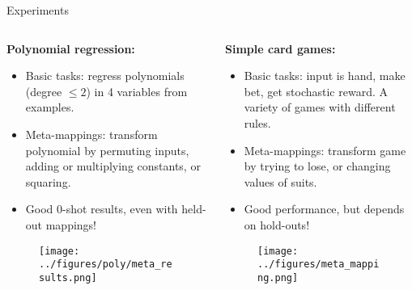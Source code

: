 \documentclass[final]{beamer}
\begin{document}
\begin{frame}[t]{}
\begin{columns}
\begin{column}[t]{0.496\textwidth}
\begin{block}{\huge Experiments}
\vspace{-0.5em}
\begin{columns}
\begin{column}[t]{0.48\textwidth}
\textbf{Polynomial regression:}
\begin{itemize}
\item Basic tasks: regress polynomials (degree \(\leq 2\)) in 4 variables from examples. 
\item Meta-mappings: transform polynomial by permuting inputs, adding or multiplying constants, or squaring. 
\item Good 0-shot results, even with held-out mappings!
\end{itemize}
\begin{figure}[H]
\texttt{[image: ../figures/poly/meta\_results.png]}
\end{figure}
\end{column}
\begin{column}[t]{0.48\textwidth}
\textbf{Simple card games:}
\begin{itemize}
\item Basic tasks: input is hand, make bet, get stochastic reward. A variety of games with different rules. 
\item Meta-mappings: transform game by trying to lose, or changing values of suits. 
\item Good performance, but depends on hold-outs!
\end{itemize}
\begin{figure}[H]
\texttt{[image: ../figures/meta\_mapping.png]}
\end{figure}
\end{column}
\end{columns}
\end{block}
\end{column}


\end{columns}
\end{frame}
\end{document}
